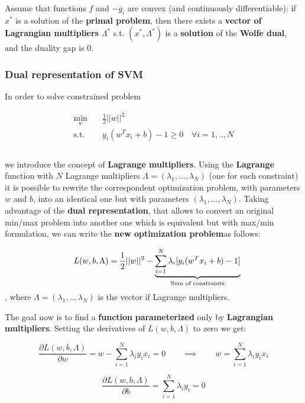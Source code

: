 Assume that functions $f$ and $-g_i$ are convex (and continuously differentiable): if $x^*$ is a solution of the \textbf{primal problem}, then there exists a \textbf{vector of Lagrangian multipliers} $\Lambda^*$ s.t. $(x^*, \Lambda^*)$ is a \textbf{solution} of the \textbf{Wolfe dual}, and the duality gap is 0.

\subsubsection{Dual representation of SVM}
In order to solve constrained problem 

\begin{equation}\label{eq_svm2}
\begin{aligned}
\min_{w} \quad & \frac{1}{2} ||w||^2\\
\textrm{s.t.} \quad & y_{i}(w^Tx_{i}+b) - 1 \geq 0 \quad \forall i = 1,..,N\\ \\
\end{aligned}
\end{equation}

we introduce the concept of \textbf{Lagrange multipliers}. Using the \textbf{Lagrange} function with $N$ Lagrange multipliers $\Lambda = (\lambda_1,\dots,\lambda_N)$ (one for each constraint) it is possible to rewrite the correspondent optimization problem, with parameters $w$ and $b$, into an identical one but with parameters $(\lambda_1,\dots,\lambda_N)$. Taking advantage of the \textbf{dual representation}, that allows to convert an original min/max problem into another one which is equivalent but with max/min formulation, we can write the \textbf{new optimization problem}as follows:

\begin{equation}
\quad L(w,b,\Lambda) = \frac{1}{2}||w||^2 - \underbrace{\sum_{i = 1}^{N}\lambda_i[y_i(w^Tx_i+b)-1]}_{\text{Sum of constraints}}\\
\end{equation}
, where $\Lambda = (\lambda_1, .., \lambda_N)$ is the vector if Lagrange multipliers.

The goal now is to find a \textbf{function} \textbf{parameterized} only by \textbf{Lagrangian multipliers}. Setting the derivatives of $L(w,b,\Lambda)$ to zero we get:

$$\frac{\partial L(w,b,\Lambda)}{\partial w} = w- \sum_{i = 1}^{N}\lambda_iy_ix_i = 0 \qquad \implies \qquad w = \sum_{i = 1}^{N}\lambda_iy_ix_i$$

$$
\frac{\partial L(w,b,\Lambda)}{\partial b} =\sum_{i = 1}^{N}\lambda_iy_i = 0 
$$

